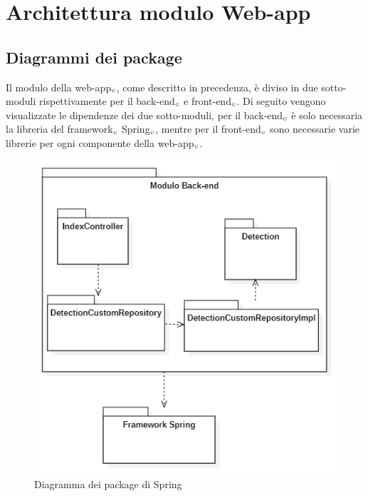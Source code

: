 \section{Architettura modulo Web-app}\label{ArchitetturaModuloWebApp}
\subsection{Diagrammi dei package}\label{ArchitetturaModuloWebAppDiagrammiDeiPackage}
Il modulo della web-app$_{\scaleto{G}{3pt}}$, come descritto in precedenza, è diviso in due sotto-moduli rispettivamente per il back-end$_{\scaleto{G}{3pt}}$ e front-end$_{\scaleto{G}{3pt}}$. Di seguito vengono visualizzate le dipendenze dei due sotto-moduli, per il back-end$_{\scaleto{G}{3pt}}$ è solo necessaria la libreria del framework$_{\scaleto{G}{3pt}}$ Spring$_{\scaleto{G}{3pt}}$, mentre per il front-end$_{\scaleto{G}{3pt}}$ sono necessarie varie librerie per ogni componente della web-app$_{\scaleto{G}{3pt}}$.
\begin{figure}[H]
  \begin{center}
    \includegraphics[scale=0.8]{../immagini/diag_PB/diag_pack_spring.png}
    \caption{Diagramma dei package di Spring}
  \end{center}
\end{figure}

